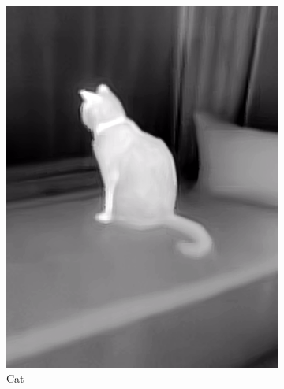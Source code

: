 \documentclass{l4proj}
\begin{document}
\begin{figure}[ht]
\begin{subfigure}[h!]{0.18\textwidth}
    \includegraphics[width=\textwidth, trim={0cm 2.5cm 0cm 2.5cm}, clip]{images/dataset/cat/lwir.png}
    \caption{Cat}
  \end{subfigure}
  \begin{subfigure}[h!]{0.18\textwidth}

\end{subfigure}
\end{figure}
\end{document}
